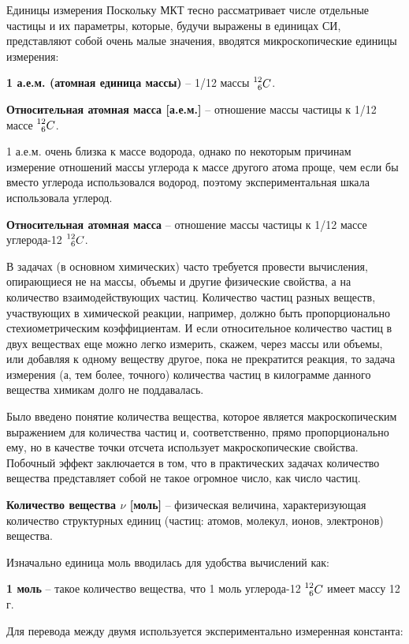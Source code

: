 \documentclass{article}
\newcommand{\definition}[2]{\begin{samepage} \textbf{#1} -- #2. \end{samepage} \par}
\begin{document}
	\begin{section}{Единицы измерения}
		Поскольку МКТ тесно рассматривает числе отдельные частицы и их параметры, которые, будучи выражены в единицах СИ, представляют собой очень малые значения, вводятся микроскопические единицы измерения:

		\definition{1 а.е.м. (атомная единица массы)}{1/12 массы $\prescript{12}{6}{C}$}

		\definition{Относительная атомная масса [а.е.м.]}{отношение массы частицы к 1/12 массе $\prescript{12}{6}{C}$}

		1 а.е.м. очень близка к массе водорода, однако по некоторым причинам измерение отношений массы углерода к массе другого атома проще, чем если бы вместо углерода использовался водород, поэтому экспериментальная шкала использовала углерод.

		\definition{Относительная атомная масса}{отношение массы частицы к 1/12 массе углерода-12 $\prescript{12}{6}{C}$}

		В задачах (в основном химических) часто требуется провести вычисления, опирающиеся не на массы, объемы и другие физические свойства, а на количество взаимодействующих частиц. Количество частиц разных веществ, участвующих в химической реакции, например, должно быть пропорционально стехиометрическим коэффициентам. И если относительное количество частиц в двух веществах еще можно легко измерить, скажем, через массы или объемы, или добавляя к одному веществу другое, пока не прекратится реакция, то задача измерения (а, тем более, точного) количества частиц в килограмме данного вещества химикам долго не поддавалась.

		Было введено понятие количества вещества, которое является макроскопическим выражением для количества частиц и, соответственно, прямо пропорционально ему, но в качестве точки отсчета использует макроскопические свойства. Побочный эффект заключается в том, что в практических задачах количество вещества представляет собой не такое огромное число, как число частиц.

		\definition{Количество вещества $\nu$ [моль]}{физическая величина, характеризующая количество структурных единиц (частиц: атомов, молекул, ионов, электронов) вещества}

		Изначально единица моль вводилась для удобства вычислений как:

		\definition{1 моль}{такое количество вещества, что 1 моль углерода-12 $\prescript{12}{6}{C}$ имеет массу 12 г}

		Для перевода между двумя используется экспериментально измеренная константа:


\end{section}
\end{document}
